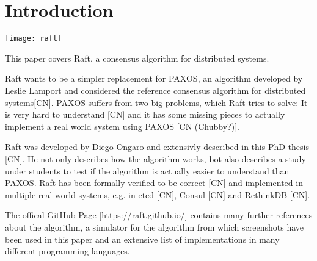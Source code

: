 




\begin{titlepage}
\afterpage{\restorepagecolor}
\newcommand{\colorRule}[3][black]{\textcolor[HTML]{#1}{\rule{#2}{#3}}}
\end{titlepage}
\restoregeometry



{
\hypersetup{linkcolor=}
\setcounter{tocdepth}{2}
\tableofcontents
\pagebreak
}

\section{Introduction}

\texttt{[image: raft]}

This paper covers Raft, a consensus algorithm for distributed systems.

Raft wants to be a simpler replacement for PAXOS, an algorithm developed by Leslie Lamport and considered the reference consensus algorithm for distributed systems[CN]. PAXOS suffers from two big problems, which Raft tries to solve: It is very hard to understand [CN] and it has some missing pieces to actually implement a real world system using PAXOS [CN (Chubby?)].

Raft was developed by Diego Ongaro and extensivly described in this PhD thesis [CN]. He not only describes how the algorithm works, bot also describes a study under students to test if the algorithm is actually easier to understand than PAXOS. Raft has been formally verified to be correct [CN] and implemented in multiple real world systems, e.g. in etcd [CN], Consul [CN] and RethinkDB [CN].

The offical GitHub Page [https://raft.github.io/] contains many further references about the algorithm, a simulator for the algorithm from which screenshots have been used in this paper and an extensive list of implementations in many different programming languages.

